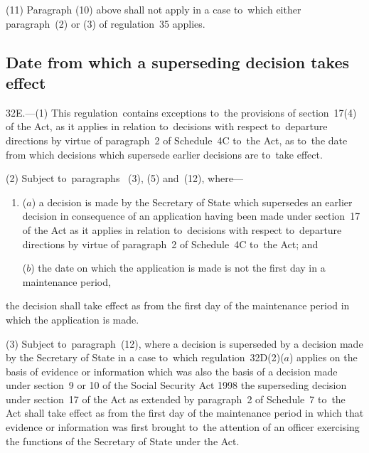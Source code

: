 \documentclass[12pt,a4paper]{article}
\begin{document}
(11) Paragraph (10) above shall not apply in a case to~which either paragraph~(2) or (3) of regulation~35 applies.


\subsection[32E. Date from which a superseding decision takes effect]{Date from which a superseding decision takes effect}

32E.—(1) This regulation~contains exceptions to~the provisions of section~17(4) of the Act, as it applies in relation to~decisions with respect to~departure directions by virtue of paragraph~2 of Schedule~4C to~the Act, as to~the date from which decisions which supersede earlier decisions are to~take effect.

(2) Subject to~paragraphs~%
(3), (5) and~(12),  %
where---
\begin{enumerate}\item[]
($a$) a decision is made by the Secretary of State which supersedes an earlier decision in consequence of an application having been made under section~17 of the Act as it applies in relation to~decisions with respect to~departure directions by virtue of paragraph~2 of Schedule~4C to~the Act; and

($b$) the date on which the application is made is not the first day in a maintenance period, 
\end{enumerate}
the decision shall take effect as from the first day of the maintenance period in which the application is made.

(3) 
Subject to~paragraph~(12), where a decision  %
is superseded by a decision made by the Secretary of State in a case to~which regulation~32D(2)($a$) applies on the basis of evidence or information which was also the basis of a decision made under section~9 or 10 of the Social Security Act 1998 the superseding decision under section~17 of the Act as extended by paragraph~2 of Schedule~7 to~the Act shall take effect as from the first day of the maintenance period in which that evidence or information was first brought to~the attention of an officer exercising the functions of the Secretary of State under the Act.
\end{document}
